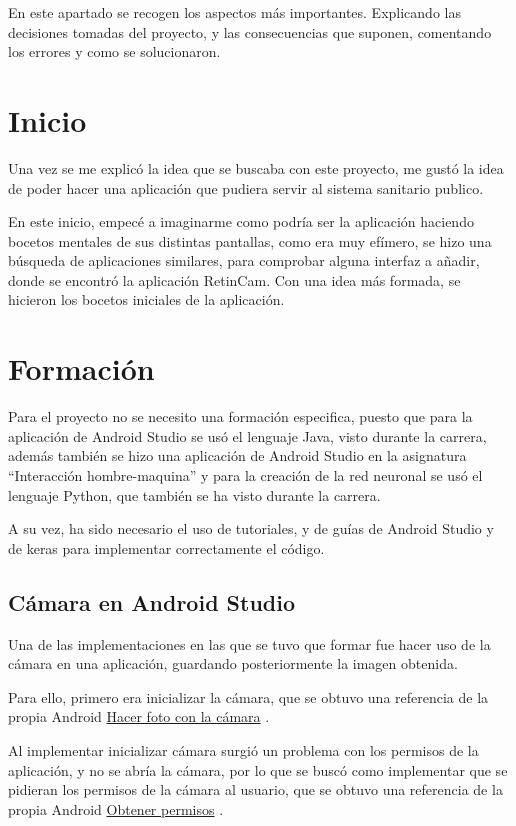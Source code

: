 
En este apartado se recogen los aspectos más importantes. Explicando las decisiones tomadas del proyecto, y las consecuencias que suponen, comentando los errores y como se solucionaron.

\section{Inicio}

Una vez se me explicó la idea que se buscaba con este proyecto, me gustó la idea de poder hacer una aplicación que pudiera servir al sistema sanitario publico.

En este inicio, empecé a imaginarme como podría ser la aplicación haciendo bocetos mentales de sus distintas pantallas, como era muy efímero, se hizo una búsqueda de aplicaciones similares, para comprobar alguna interfaz a añadir, donde se encontró la aplicación RetinCam. Con una idea más formada, se hicieron los bocetos iniciales de la aplicación.
\section{Formación}

Para el proyecto no se necesito una formación especifica, puesto que para la aplicación de Android Studio se usó el lenguaje Java, visto durante la carrera, además también se hizo una aplicación de Android Studio en la asignatura ``Interacción hombre-maquina'' y para la creación de la red neuronal se usó el lenguaje Python, que también se ha visto durante la carrera. 

A su vez, ha sido necesario el uso de tutoriales, y de guías de Android Studio y de keras para implementar correctamente el código.

\subsection{Cámara en Android Studio}

Una de las implementaciones en las que se tuvo que formar fue hacer uso de la cámara en una aplicación, guardando posteriormente la imagen obtenida.

Para ello, primero era inicializar la cámara, que se obtuvo una referencia de la propia Android \href{https://developer.android.com/training/camera/camera-intents}{Hacer foto con la cámara} \cite{android-camera-intents}.

Al implementar inicializar cámara surgió un problema con los permisos de la aplicación, y no se abría la cámara, por lo que se buscó como implementar que se pidieran los permisos de la cámara al usuario, que se obtuvo una referencia de la propia Android \href{https://developer.android.com/training/permissions/requesting?hl=es-419}{Obtener permisos} \cite{android-permissions-requesting}.

